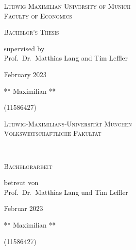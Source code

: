 \begin{titlepage}
    \vspace*{\fill}
    \centering

    \textsc{\Large Ludwig Maximilian University of Munich}\\
    \textsc{Faculty of Economics}


    \vspace{4cm}

    \begin{doublespace}
        \makeatletter
        \textsc{ \Huge \@title}
        \textsc{\Large \@subtitle}
        \makeatother
    \end{doublespace}


    \vspace{3cm}
    \huge \textsc{Bachelor's Thesis}



    \vspace{0.3cm}
    \large \textrm{supervised by\\Prof.~Dr.~Matthias Lang and Tim Leffler}

    \vspace{2cm}
    \huge
    \textrm{February 2023}

    \vspace{2cm}
    \Large{\textrm{** Maximilian **}}

    (11586427)

    \vspace*{\fill}
\end{titlepage}





\begin{titlepage}
    \vspace*{\fill}
    \centering

    \textsc{\Large Ludwig-Maximilians-Universität München}\\
    \textsc{Volkswirtschaftliche Fakultät}

    \vspace{3.2cm}

    \begin{doublespace}
        \makeatletter
        \textsc{ \Huge \titleDE}\\
        \textsc{\Large \subtitleDE}
        \makeatother
    \end{doublespace}


    \vspace{2.7cm}
    \huge \textsc{Bachelorarbeit}



    \vspace{0.3cm}
    \large \textrm{betreut von\\Prof.~Dr.~Matthias Lang und Tim Leffler}

    \vspace{2cm}
    \huge
    \textrm{Februar 2023}

    \vspace{2cm}
    \Large{\textrm{** Maximilian **}}

    (11586427)

    \vspace*{\fill}
\end{titlepage}

